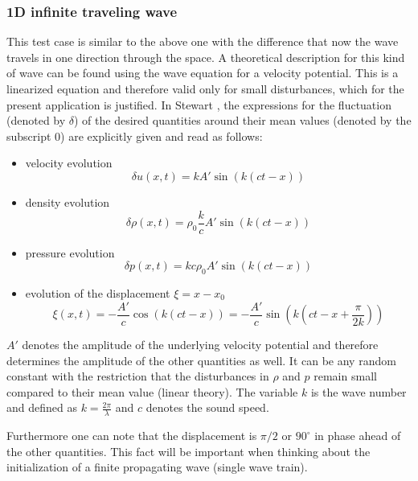 \documentclass[11pt,a4paper,twoside]{report}
\begin{document}
\subsubsection{1D infinite traveling wave}
This test case is similar to the above one with the difference that now the wave travels in one direction through the space. A theoretical description for this kind of wave can be found using the wave equation for a velocity potential. This is a linearized equation and therefore valid only for small disturbances, which for the present application is justified. In Stewart \cite{Stewart1930}, the expressions for the fluctuation (denoted by $\delta$) of the desired quantities around their mean values (denoted by the subscript $0$) are explicitly given and read as follows:
\begin{itemize}
\item velocity evolution 
\begin{equation}
\label{eq:1DWaveDetla_u}
 \delta u(x,t)=k A' \sin(k(ct-x))
\end{equation}
\item density evolution 
\begin{equation}
\label{eq:1DWaveDetla_rho}
 \delta \rho(x,t)=\rho_0\frac{k}{c} A'  \sin(k(ct-x))
\end{equation}
\item pressure evolution 
\begin{equation}
\label{eq:1DWaveDetla_p}
 \delta p(x,t)=k c \rho_0 A'  \sin(k(ct-x))
\end{equation}
\item evolution of the displacement $\xi=x-x_0$
\begin{equation}
\label{eq:1DWaveDisplacement}
 \xi(x,t)=-\frac{A' }{c} \cos(k(ct-x))=-\frac{A' }{c} \sin\left(k\left(ct-x+\frac{\pi}{2k}\right)\right)
\end{equation}

\end{itemize}

$A'$ denotes the amplitude of the underlying velocity potential and therefore determines the amplitude of the other quantities as well. It can be any random constant with the restriction that the disturbances in $\rho$ and $p$ remain small compared to their mean value (linear theory). The variable $k$ is the  wave number and defined as $k=\frac{2\pi}{\lambda}$ and $c$ denotes the sound speed.

Furthermore one can note that the displacement is $\pi/2$ or $90^\circ$ in phase ahead of the other quantities. This fact will be important when thinking about the initialization of a finite propagating wave (single wave train). 
\end{document}
